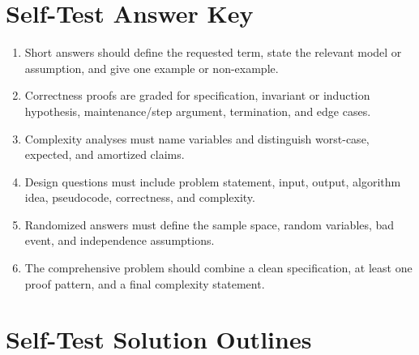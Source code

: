\documentclass[11pt]{ctexart}
\begin{document}
\section{Self-Test Answer Key}
\begin{enumerate}
  \item Short answers should define the requested term, state the relevant model or assumption, and give one example or non-example.
  \item Correctness proofs are graded for specification, invariant or induction hypothesis, maintenance/step argument, termination, and edge cases.
  \item Complexity analyses must name variables and distinguish worst-case, expected, and amortized claims.
  \item Design questions must include problem statement, input, output, algorithm idea, pseudocode, correctness, and complexity.
  \item Randomized answers must define the sample space, random variables, bad event, and independence assumptions.
  \item The comprehensive problem should combine a clean specification, at least one proof pattern, and a final complexity statement.
\end{enumerate}

\section{Self-Test Solution Outlines}
\end{document}
